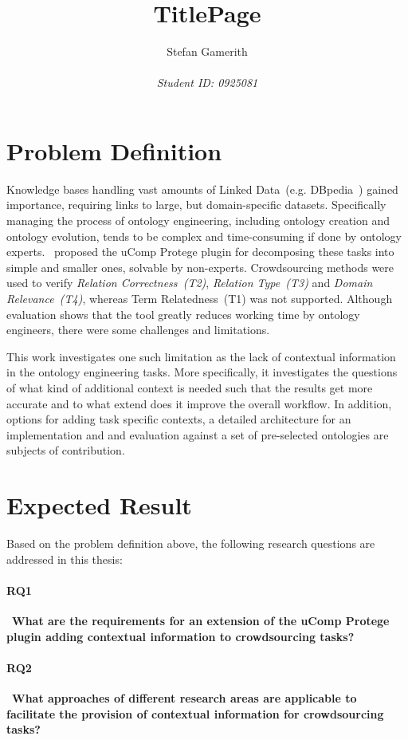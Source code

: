 \documentclass[12pt, notitlepage]{article}
\title{TitlePage}
\author{Stefan Gamerith\\\\
		\emph{Student ID: 0925081}}
\begin{document}
	\maketitle
	\thispagestyle{empty}
	\newpage
\setcounter{page}{1}

\section{Problem Definition}
Knowledge bases handling vast amounts of Linked Data~(e.g. DBpedia~\cite{lehmann2015dbpedia}) gained importance, requiring links to large, but domain-specific datasets. Specifically managing the process of ontology engineering, including ontology creation and ontology evolution, tends to be complex and time-consuming if done by ontology experts.
\citet{wohlgenannt2016crowd}~proposed the uComp Protege plugin for decomposing these tasks into simple and smaller ones, solvable by non-experts. Crowdsourcing methods were used to verify \textit{Relation Correctness~(T2)}, \textit{Relation Type~(T3)} and \textit{Domain Relevance~(T4)}, whereas Term Relatedness~(T1) was not supported. Although evaluation shows that the tool greatly reduces working time by ontology engineers, there were some challenges and limitations. 

This work investigates one such limitation as the lack of contextual information in the ontology engineering tasks. More specifically, it investigates the questions of what kind of additional context is needed such that the results get more accurate and to what extend does it improve the overall workflow. In addition, options for adding task specific contexts, a detailed architecture for an implementation and and evaluation against a set of pre-selected ontologies are subjects of contribution. 
\section{Expected Result}
Based on the problem definition above, the following research questions are addressed in this thesis:
\paragraph{RQ1}~\textbf{What are the requirements for an extension of the uComp Protege plugin adding contextual information to crowdsourcing tasks?}\\
\paragraph{RQ2}~\textbf{What approaches of different research areas are applicable to facilitate the provision of contextual information for crowdsourcing tasks?}\\
\end{document}
